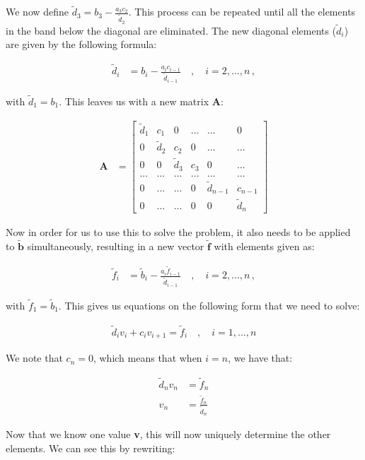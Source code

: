 \documentclass[english,notitlepage,reprint,nofootinbib]{revtex4-1}  %
\begin{document}
We now define $\tilde{d}_3 = b_3 - \frac{a_3c_2}{\tilde{d}_2}$. This process can be repeated until all the elements in the band below the diagonal are eliminated. The new diagonal elements ($\tilde{d}_i$) are given by the following formula:

\begin{align*}
\tilde{d}_i &= b_i - \frac{a_i c_{i-1}}{\tilde{d}_{i-1}} \quad , \quad i = 2,...,n \, ,
\end{align*}

with $\tilde{d}_1 = b_1$. This leaves us with a new matrix \textbf{A}:

\begin{align*}
\textbf{A} &= \begin{bmatrix}
\tilde{d}_1 & c_1 & 0 & ... & ... & 0 \\
0 & \tilde{d}_2 & c_2 & 0 & ... & ... \\
0 & 0 & \tilde{d}_3 & c_3 & 0 & ... \\
... & ... & ... & ... & ... & ... \\
0 & ... & ... & 0 & \tilde{d}_{n-1} & c_{n-1} \\
0 & ... & ... & 0 & 0 & \tilde{d}_n
\end{bmatrix}
\end{align*}


Now in order for us to use this to solve the problem, it also needs to be applied to $\tilde{\textbf{b}}$ simultaneously, resulting in a new vector $\tilde{\textbf{f}}$ with elements given as:

\begin{align*}
\tilde{f}_i &= \tilde{b}_i - \frac{a_i \tilde{f}_{i-1}}{\tilde{d}_{i-1}} \quad , \quad i = 2,...,n \, ,
\end{align*}

with $\tilde{f}_1 = \tilde{b}_1$. This gives us equations on the following form that we need to solve:

\begin{align*}
\tilde{d}_i v_i  + c_i v_{i+1} = \tilde{f}_i \quad , \quad i = 1,...,n
\end{align*}

We note that $c_n = 0$, which means that when $i=n$, we have that:

\begin{align*}
\tilde{d}_n v_n &= \tilde{f}_n \\
v_n &= \frac{\tilde{f}_n}{\tilde{d}_n}
\end{align*}

Now that we know one value \textbf{v}, this will now uniquely determine the other elements. We can see this by rewriting:
\end{document}
